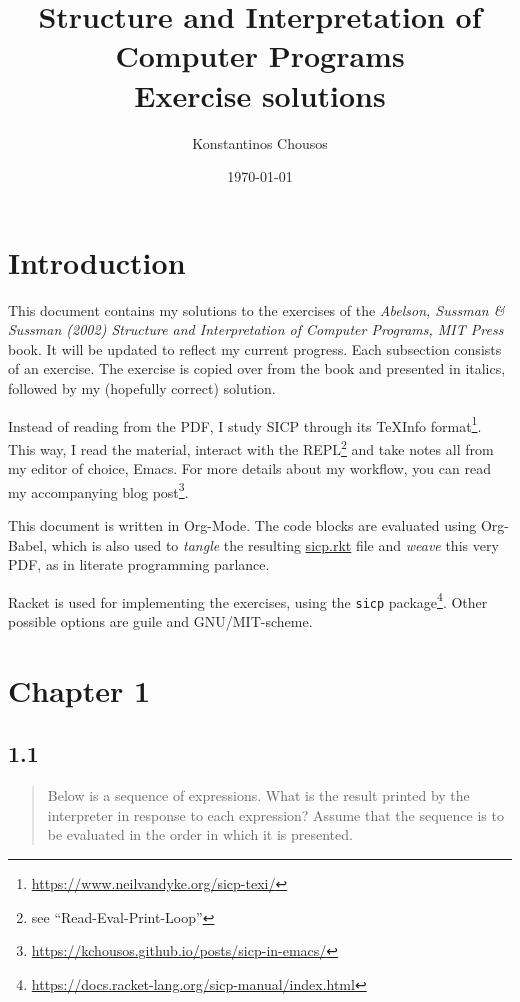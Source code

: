 \documentclass[a4paper, titlepage, twoside]{article}
\author{Konstantinos Chousos}
\date{\today}
\title{\textbf{Structure and Interpretation of Computer Programs}\\\medskip
\large Exercise solutions}
\begin{document}
\maketitle

\section*{Introduction}
\label{sec:orgf7eac53}

This document contains my solutions to the exercises of the \emph{Abelson, Sussman \& Sussman (2002) Structure and Interpretation of Computer Programs, MIT Press} book. It will be updated to reflect my current progress. Each subsection consists of an exercise. The exercise is copied over from the book and presented in italics, followed by my (hopefully correct) solution.

Instead of reading from the PDF, I study SICP through its TeXInfo format\footnote{\url{https://www.neilvandyke.org/sicp-texi/}}. This way, I read the material, interact with the REPL\footnote{see ``Read-Eval-Print-Loop''} and take notes all from my editor of choice, Emacs. For more details about my workflow, you can read my accompanying blog post\footnote{\url{https://kchousos.github.io/posts/sicp-in-emacs/}}.

This document is written in Org-Mode. The code blocks are evaluated using Org-Babel, which is also used to \emph{tangle} the resulting \href{./sicp.rkt}{sicp.rkt} file and \emph{weave} this very PDF, as in literate programming parlance.

Racket is used for implementing the exercises, using the \texttt{sicp} package\footnote{\url{https://docs.racket-lang.org/sicp-manual/index.html}}. Other possible options are guile and GNU/MIT-scheme.

\newpage

\section*{Chapter 1}
\label{sec:org5c1747a}

\subsection*{1.1}
\label{sec:org0bead69}

\begin{quote}
Below is a sequence of expressions. What is the result printed by the interpreter in response to each expression? Assume that the sequence is to be evaluated in the order in which it is presented.
\end{quote}
\end{document}
